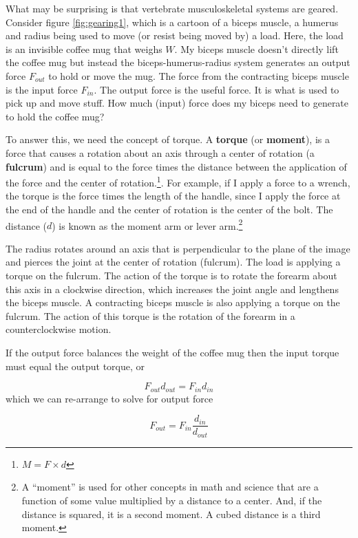 \documentclass[]{book}
\let\rmarkdownfootnote\footnote%
\def\footnote{\protect\rmarkdownfootnote}
\begin{document}
What may be surprising is that vertebrate musculoskeletal systems are
geared. Consider figure \ref{fig:gearing1}, which is a cartoon of a
biceps muscle, a humerus and radius being used to move (or resist being
moved by) a load. Here, the load is an invisible coffee mug that weighs
\(W\). My biceps muscle doesn't directly lift the coffee mug but instead
the biceps-humerus-radius system generates an output force \(F_{out}\)
to hold or move the mug. The force from the contracting biceps muscle is
the input force \(F_{in}\). The output force is the useful force. It is
what is used to pick up and move stuff. How much (input) force does my
biceps need to generate to hold the coffee mug?

To answer this, we need the concept of torque. A \textbf{torque} (or
\textbf{moment}), is a force that causes a rotation about an axis
through a center of rotation (a \textbf{fulcrum}) and is equal to the
force times the distance between the application of the force and the
center of rotation.\footnote{\(M = F \times d\)}. For example, if I
apply a force to a wrench, the torque is the force times the length of
the handle, since I apply the force at the end of the handle and the
center of rotation is the center of the bolt. The distance (\(d\)) is
known as the moment arm or lever arm.\footnote{A ``moment'' is used for
  other concepts in math and science that are a function of some value
  multiplied by a distance to a center. And, if the distance is squared,
  it is a second moment. A cubed distance is a third moment.}

The radius rotates around an axis that is perpendicular to the plane of
the image and pierces the joint at the center of rotation (fulcrum). The
load is applying a torque on the fulcrum. The action of the torque is to
rotate the forearm about this axis in a clockwise direction, which
increases the joint angle and lengthens the biceps muscle. A contracting
biceps muscle is also applying a torque on the fulcrum. The action of
this torque is the rotation of the forearm in a counterclockwise motion.

If the output force balances the weight of the coffee mug then the input
torque must equal the output torque, or

\[F_{out}d_{out} = F_{in}d_{in}\] which we can re-arrange to solve for
output force

\[F_{out}= F_{in}\frac{d_{in}}{d_{out}}\]
\end{document}
